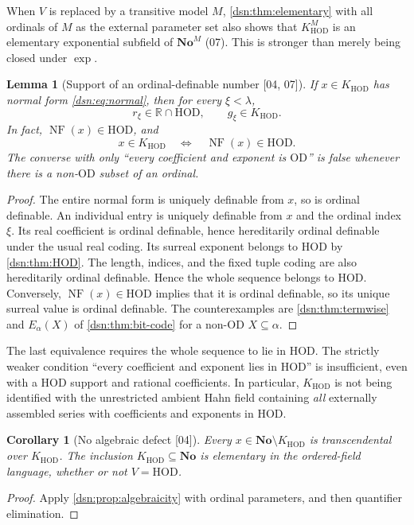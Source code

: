 \documentclass[11pt,a4paper]{article}
\numberwithin{equation}{section}
\newtheorem{lemma}[lemma]{Lemma}
\newtheorem{corollary}[corollary]{Corollary}
\theoremstyle{definition}
\theoremstyle{remark}
\newcommand{\No}{\mathbf{No}}
\newcommand{\OD}{\mathrm{OD}}
\newcommand{\HOD}{\mathrm{HOD}}
\newcommand{\R}{\mathbb R}
\newcommand{\NF}{\operatorname{NF}}
\newcommand{\KH}{K_{\HOD}}
\newcommand{\src}[1]{\textup{\textsf{\small[#1]}}}
\begin{document}
When $V$ is replaced by a transitive model $M$, \cref{dsn:thm:elementary}
with all ordinals of $M$ as the external parameter set also shows that
$\KH^M$ is an elementary exponential subfield of $\No^M$ (07). This is
stronger than merely being closed under $\exp$.

\begin{lemma}[Support of an ordinal-definable number \src{04, 07}]
\label{dsn:lem:HODsupport}
If $x\in\KH$ has normal form \eqref{dsn:eq:normal}, then for every
$\xi<\lambda$,
\[
 r_\xi\in\R\cap\HOD,\qquad g_\xi\in\KH.
\]
In fact, $\NF(x)\in\HOD$, and
\begin{equation}\label{dsn:eq:NFcriterion}
 x\in\KH\quad\Longleftrightarrow\quad\NF(x)\in\HOD.
\end{equation}
The converse with only ``every coefficient and exponent is $\OD$'' is false
whenever there is a non-$\OD$ subset of an ordinal.
\end{lemma}
\begin{proof}
The entire normal form is uniquely definable from $x$, so is ordinal
definable. An individual entry is uniquely definable from $x$ and the
ordinal index $\xi$. Its real coefficient is ordinal definable, hence
hereditarily ordinal definable under the usual real coding. Its
surreal exponent belongs to $\HOD$ by \cref{dsn:thm:HOD}. The length,
indices, and the fixed tuple coding are also hereditarily ordinal
definable. Hence the whole sequence belongs to $\HOD$. Conversely,
$\NF(x)\in\HOD$ implies that it is ordinal definable, so its unique
surreal value is ordinal definable. The counterexamples are
\cref{dsn:thm:termwise} and $E_\alpha(X)$ of \cref{dsn:thm:bit-code} for a
non-$\OD$ $X\subseteq\alpha$.
\end{proof}

The last equivalence requires the whole sequence to lie in $\HOD$. The
strictly weaker condition ``every coefficient and exponent lies in
$\HOD$'' is insufficient, even with a $\HOD$ support and rational
coefficients. In particular, $\KH$ is not being identified with the
unrestricted ambient Hahn field containing \emph{all} externally assembled
series with coefficients and exponents in $\HOD$.

\begin{corollary}[No algebraic defect \src{04}]\label{dsn:cor:noalgebraic}
Every $x\in\No\setminus\KH$ is transcendental over $\KH$. The
inclusion $\KH\subseteq\No$ is elementary in the ordered-field
language, whether or not $V=\HOD$.
\end{corollary}
\begin{proof}
Apply \cref{dsn:prop:algebraicity} with ordinal parameters,
and then quantifier elimination.
\end{proof}
\end{document}
